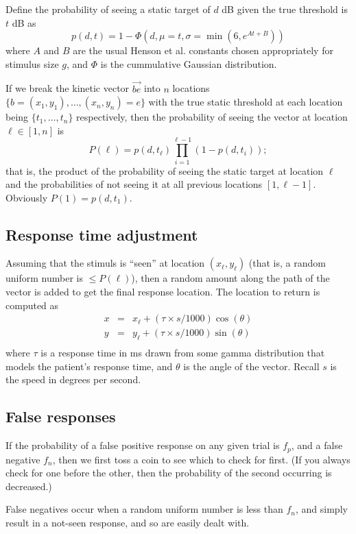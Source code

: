 \documentclass{article}
\begin{document}
Define the probability of seeing a static target of $d$ dB given 
the true threshold is $t$ dB as 
$$
    p(d, t) = 1 - \Phi(d, \mu=t, \sigma=\min(6, e^{At + B})) 
$$
where $A$ and $B$ are the usual Henson et al. constants chosen appropriately for stimulus
size $g$, and $\Phi$ is the cummulative Gaussian distribution.

If we break the kinetic vector $\vec{be}$ into $n$ 
locations $\{b=(x_1,y_1),\ldots,(x_n,y_n)=e\}$ with the true static threshold at each location
being $\{t_1,\ldots,t_n\}$ respectively, then the probability of seeing the vector at
location $\ell \in[1,n]$ is 
$$
    P(\ell) = p(d, t_\ell) \prod_{i=1}^{\ell-1} (1 - p(d, t_i));
$$
that is, the product of the probability of seeing the static target at location $\ell$
and the probabilities of not seeing it at all previous locations $[1,\ell-1]$.
Obviously $P(1) = p(d,t_1)$.

\subsection{Response time adjustment}

Assuming that the stimuls is ``seen'' at location $(x_\ell,y_\ell)$ 
(that is, a random uniform number is $\le P(\ell)$), 
then a random amount along the path of the vector is added to get the final response
location.
The location to return is computed as 
\begin{eqnarray*}
x & = & x_\ell + (\tau\times s/1000) \cos(\theta) \\
y & = & y_\ell + (\tau\times s/1000) \sin(\theta) \\
\end{eqnarray*}
where $\tau$ is a response time in ms drawn from some gamma distribution that models the
patient's response time, 
and $\theta$ is the angle of the vector. Recall $s$ is the speed in degrees per second.


\subsection{False responses}

If the probability of a false positive response on any given trial is $f_p$, and a false
negative $f_n$, then we first toss a coin to see which to check for first. (If you always
check for one before the other, then the probability of the second occurring is decreased.)

False negatives occur when a random uniform number is less than $f_n$, and simply result 
in a not-seen response, and so are easily dealt with.
\end{document}
